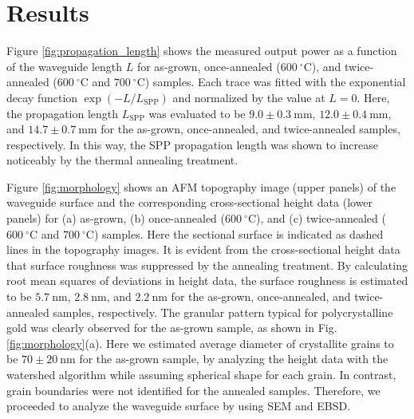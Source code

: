 \documentclass[aip,apl,reprint]{revtex4-1}
\begin{document}
\section{Results}
\label{sec:result}
Figure \ref{fig:propagation_length} shows the measured output power as a function of the waveguide length $L$ for as-grown, once-annealed ($600\:^\circ\mathrm{C}$), and twice-annealed ($600\:^\circ\mathrm{C}$ and $700\:^\circ\mathrm{C}$) samples.
\color{red}Each trace was fitted with the exponential decay function $\exp(-L/L_{\mathrm{SPP}})$ and normalized by the value at $L=0$. Here, \color{black}the propagation length $L_{\mathrm{SPP}}$ was evaluated \color{red}to be \color{black}$9.0\pm0.3\:\mathrm{mm}$, $12.0\pm0.4\:\mathrm{mm}$, and $14.7\pm0.7\:\mathrm{mm}$ for the as-grown, once-annealed, and twice-annealed samples, respectively.
In this way, the SPP propagation length was shown to increase noticeably by the thermal annealing treatment.

\color{red}Figure \ref{fig:morphology} shows an AFM topography \color{black}image (upper panels) of the waveguide surface and \color{red}the corresponding \color{black}cross-sectional height data (lower panels)  for (a) as-grown, (b) once-annealed ($600\:^\circ\mathrm{C}$), and (c) twice-annealed ($600\:^\circ\mathrm{C}$ and $700\:^\circ\mathrm{C}$) samples. Here the sectional surface is indicated as dashed \color{red}lines \color{black}in the topography images.
It is evident from the cross-sectional height data \color{red}that \color{black}surface roughness \color{red}was suppressed by the annealing treatment\color{black}. By calculating root mean squares of deviations in height data, the surface roughness is estimated to be $5.7\:\mathrm{nm}$, $2.8\:\mathrm{nm}$, and $2.2\:\mathrm{nm}$ for the as-grown, once-annealed, and twice-annealed samples, respectively. 
The granular pattern typical for polycrystalline gold was clearly observed for the as-grown sample, as shown in Fig. \ref{fig:morphology}(a). \color{red}Here we \color{black}estimated average diameter of crystallite grains to be $70\pm20\:\mathrm{nm}$ for the as-grown sample, by analyzing the height data with the watershed algorithm\cite{Petr} \color{red}while assuming \color{black}spherical shape for each grain. \color{red}In contrast, \color{black}grain boundaries \color{red}were not identified \color{black}for the annealed samples. Therefore, we \color{red}proceeded to analyze \color{black}the waveguide surface by using SEM and EBSD.
\end{document}
